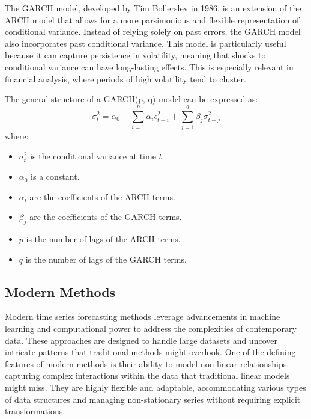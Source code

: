 The GARCH model, developed by Tim Bollerslev in 1986, is an extension of the ARCH model that allows for a more parsimonious and flexible representation of conditional variance. Instead of relying solely on past errors, the GARCH model also incorporates past conditional variance. This model is particularly useful because it can capture persistence in volatility, meaning that shocks to conditional variance can have long-lasting effects. This is especially relevant in financial analysis, where periods of high volatility tend to cluster.

The general structure of a GARCH(p, q) model can be expressed as:
\[
\sigma_t^2 = \alpha_0 + \sum_{i=1}^p \alpha_i \epsilon_{t-i}^2 + \sum_{j=1}^q \beta_j \sigma_{t-j}^2
\]
where:
\begin{itemize}
    \item \( \sigma_t^2 \) is the conditional variance at time \( t \).
    \item \( \alpha_0 \) is a constant.
    \item \( \alpha_i \) are the coefficients of the ARCH terms.
    \item \( \beta_j \) are the coefficients of the GARCH terms.
    \item \( p \) is the number of lags of the ARCH terms.
    \item \( q \) is the number of lags of the GARCH terms.
\end{itemize}
\vspace{10pt}



\subsection{Modern Methods}

Modern time series forecasting methods leverage advancements in machine learning and computational power to address the complexities of contemporary data. These approaches are designed to handle large datasets and uncover intricate patterns that traditional methods might overlook. One of the defining features of modern methods is their ability to model non-linear relationships, capturing complex interactions within the data that traditional linear models might miss. They are highly flexible and adaptable, accommodating various types of data structures and managing non-stationary series without requiring explicit transformations.

